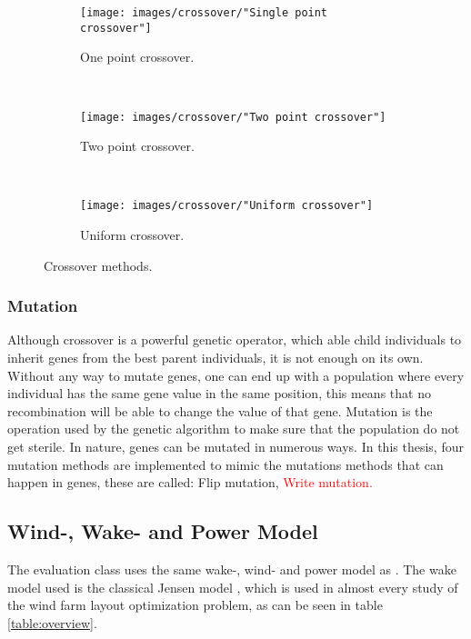 \begin{figure}[h!]
    \centering
    \begin{subfigure}[b]{0.3\textwidth}
        \texttt{[image: images/crossover/"Single point crossover"]}
        \caption{One point crossover.}
        \label{figure:single point crossover}
    \end{subfigure}
    ~ 
    \begin{subfigure}[b]{0.3\textwidth}
        \texttt{[image: images/crossover/"Two point crossover"]}
        \caption{Two point crossover.}
        \label{figure:two point crossover}
    \end{subfigure}
    ~
    \begin{subfigure}[b]{0.3\textwidth}
        \texttt{[image: images/crossover/"Uniform crossover"]}
        \caption{Uniform crossover.}
        \label{figure:uniform crossover}
    \end{subfigure}
    \caption{Crossover methods.}\label{figure:crossover methods}
\end{figure}


\subsubsection{Mutation}
Although crossover is a powerful genetic operator, which able child individuals to inherit genes from the best parent individuals, it is not enough on its own. Without any way to mutate genes, one can end up with a population where every individual has the same gene value in the same position, this means that no recombination will be able to change the value of that gene. Mutation is the operation used by the genetic algorithm to make sure that the population do not get sterile. In nature, genes can be mutated in numerous ways. In this thesis, four mutation methods are implemented to mimic the mutations methods that can happen in genes, these are called: Flip mutation, \textcolor{red}{Write mutation.}


\subsection{Wind-, Wake- and Power Model}\label{subsection:wind-, wake- and power model}
The evaluation class uses the same wake-, wind- and power model as \cite{Kusiak}. The wake model used is the classical Jensen model \citep{Jensen}, which is used in almost every study of the wind farm layout optimization problem, as can be seen in table \ref{table:overview}. \\

